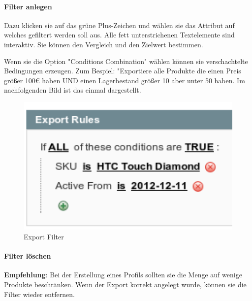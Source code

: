 \documentclass[a4paper,12pt]{book}
\begin{document}
\paragraph{Filter anlegen}
Dazu klicken sie auf das grüne Plus-Zeichen und wählen sie das
Attribut auf welches gefiltert werden soll aus. Alle fett
unterstrichenen Textelemente sind interaktiv. Sie können den Vergleich
und den Zielwert bestimmen.

Wenn sie die Option "Conditions Combination" wählen können sie
verschachtelte Bedingungen erzeugen. Zum Bespiel: "Exportiere alle
Produkte die einen Preis größer 100\euro{} haben UND einen Lagerbestand
größer 10 aber unter 50 haben. Im nachfolgenden Bild ist das einmal
dargestellt.

\begin{figure}
 \includegraphics[width=1\textwidth]{img/bild08.png}
  \caption{Export Filter}
  \label{figure:export_filter}
\end{figure}

\paragraph{Filter löschen}

\textbf{Empfehlung}: Bei der Erstellung eines Profils sollten sie die Menge auf
wenige Produkte beschränken. Wenn der Export korrekt angelegt wurde,
können sie die Filter wieder entfernen.
\end{document}
